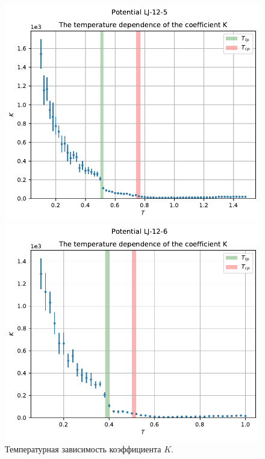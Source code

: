 \documentclass[pdf,hyperref={unicode}]{beamer}
\begin{document}
\begin{frame}
\begin{columns}
\begin{column}{0.7\linewidth}
{\begin{figure}[h]
\begin{center}
\begin{minipage}[h]{0.45\linewidth}
\includegraphics[width=\textwidth, keepaspectratio]{plot_K_Potential LJ-12-5_1}
\end{minipage}
\begin{minipage}[h]{0.45\linewidth}
\includegraphics[width=\textwidth, keepaspectratio]{plot_K_Potential LJ-12-6_1}
\end{minipage}
\caption{Температурная зависимость коэффициента $K$.}
\label{risK}
\end{center}
\end{figure}
}
\end{column}


\end{columns}
\end{frame}
\end{document}

